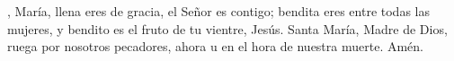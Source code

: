 , María, llena eres de gracia, el Señor es contigo; bendita eres entre todas las mujeres,
y bendito es el fruto de tu vientre, Jesús. Santa María, Madre de Dios, ruega por nosotros pecadores,
ahora u en el hora de nuestra muerte. Amén.
